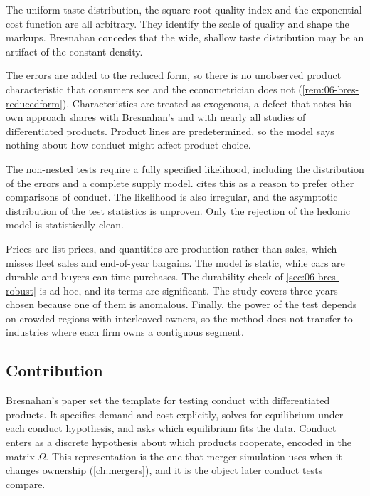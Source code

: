 The uniform taste distribution, the square-root quality index and the exponential cost function are all arbitrary.
They identify the scale of quality and shape the markups. Bresnahan concedes that the wide, shallow taste
distribution may be an artifact of the constant density.

The errors are added to the reduced form, so there is no unobserved product characteristic that consumers see and
the econometrician does not (\cref{rem:06-bres-reducedform}). Characteristics are treated as exogenous, a defect that
\citet[p.~245]{Berry1994} notes his own approach shares with Bresnahan's and with nearly all studies of
differentiated products. Product lines are predetermined, so the model says nothing about how conduct might affect
product choice.

The non-nested tests require a fully specified likelihood, including the distribution of the errors and a complete
supply model. \citet[p.~335]{Nevo2001} cites this as a reason to prefer other comparisons of conduct. The likelihood is
also irregular, and the asymptotic distribution of the test statistics is unproven. Only the rejection of the
hedonic model is statistically clean.

Prices are list prices, and quantities are production rather than sales, which misses fleet sales and end-of-year
bargains. The model is static, while cars are durable and buyers can time purchases. The durability check of
\cref{sec:06-bres-robust} is ad hoc, and its terms are significant. The study covers three years chosen because one of
them is anomalous. Finally, the power of the test depends on crowded regions with interleaved owners, so the method
does not transfer to industries where each firm owns a contiguous segment.

\subsection{Contribution}\label{sec:06-bres-contribution}

Bresnahan's paper set the template for testing conduct with differentiated products. It specifies demand and cost
explicitly, solves for equilibrium under each conduct hypothesis, and asks which equilibrium fits the data. Conduct
enters as a discrete hypothesis about which products cooperate, encoded in the matrix $\Omega$.
This representation is the one that merger simulation uses when it changes ownership (\cref{ch:mergers}), and it is
the object later conduct tests compare.

